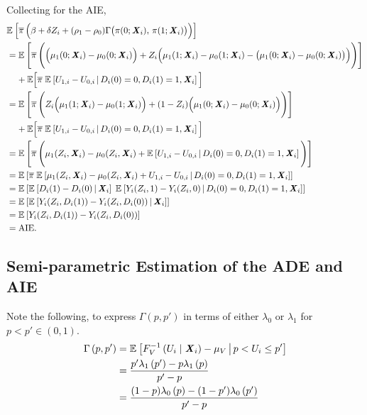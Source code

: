 Collecting for the AIE,
\begin{align*}
    &\mathbb{E}_{} \left[  \overline{\pi} \, \Big( \beta +  \delta Z_i +
        (\rho_1 - \rho_0) \Gamma \big(\pi(0; \boldsymbol{\mathit{X}}_i), \, \pi(1; \boldsymbol{\mathit{X}}_i) \big) \Big)  \right] \\
    &= \mathbb{E}_{} \left[  \overline{\pi} \, \Bigg( \Big( \mu_1(0; \boldsymbol{\mathit{X}}_i) - \mu_0(0; \boldsymbol{\mathit{X}}_i) \Big)
        +  Z_i \Big( \mu_1(1; \boldsymbol{\mathit{X}}_i) - \mu_0(1; \boldsymbol{\mathit{X}}_i)
            - \big(\mu_1(0; \boldsymbol{\mathit{X}}_i) - \mu_0(0; \boldsymbol{\mathit{X}}_i) \big) \Big) \Bigg)  \right] \\
    &\;\;\;\; + \mathbb E \Big[ \overline{\pi} \; \mathbb{E}_{} \left[  U_{1,i} - U_{0,i}  \, \middle\vert \, D_i(0) = 0, D_i(1) = 1, \boldsymbol{\mathit{X}}_i \right] \Big] \\
    &= \mathbb{E}_{} \left[  \overline{\pi} \, \Bigg(
        Z_i \Big( \mu_1(1; \boldsymbol{\mathit{X}}_i) - \mu_0(1; \boldsymbol{\mathit{X}}_i) \Big)
        + (1 - Z_i) \Big( \mu_1(0; \boldsymbol{\mathit{X}}_i) - \mu_0(0; \boldsymbol{\mathit{X}}_i) \Big) \Bigg)  \right] \\
    &\;\;\;\; + \mathbb E \Big[ \overline{\pi} \; \mathbb{E}_{} \left[  U_{1,i} - U_{0,i}  \, \middle\vert \, D_i(0) = 0, D_i(1) = 1, \boldsymbol{\mathit{X}}_i \right] \Big] \\
    &= \mathbb{E}_{} \left[  \overline{\pi} \, \Bigg(
        \mu_1(Z_i, \boldsymbol{\mathit{X}}_i) - \mu_0(Z_i, \boldsymbol{\mathit{X}}_i)
        + \mathbb{E}_{} \left[  U_{1,i} - U_{0,i}  \, \middle\vert \, D_i(0) = 0, D_i(1) = 1, \boldsymbol{\mathit{X}}_i \right] \Bigg)  \right] \\
    &= \mathbb{E}_{} \left[  \overline{\pi} \; \mathbb{E}_{} \left[ 
        \mu_1(Z_i, \boldsymbol{\mathit{X}}_i) - \mu_0(Z_i, \boldsymbol{\mathit{X}}_i) + U_{1,i} - U_{0,i}  \, \middle\vert \, 
            D_i(0) = 0, D_i(1) = 1, \boldsymbol{\mathit{X}}_i \right]  \right] \\
    &= \mathbb{E}_{} \left[  \mathbb{E}_{} \left[ D_i(1) - D_i(0) \, \middle\vert \, \boldsymbol{\mathit{X}}_i \right] \; \mathbb{E}_{} \left[ 
        Y_i(Z_i, 1) - Y_i(Z_i, 0)  \, \middle\vert \,  D_i(0) = 0, D_i(1) = 1, \boldsymbol{\mathit{X}}_i \right]  \right] \\
    &= \mathbb{E}_{} \left[  \mathbb{E}_{} \left[ Y_i(Z_i,D_i(1)) - Y_i(Z_i,D_i(0)) \, \middle\vert \, \boldsymbol{\mathit{X}}_i \right]  \right] \\
    &= \mathbb{E}_{} \left[  Y_i(Z_i,D_i(1)) - Y_i(Z_i,D_i(0))  \right] \\
    &= \text{AIE}.
\end{align*}

\subsection{Semi-parametric Estimation of the ADE and AIE}
\label{appendix:semi-parametric}
Note the following, to express $\Gamma(p,p')$ in terms of either $\lambda_0$ or $\lambda_1$
for $p < p' \in (0,1)$.
\begin{align*}
    \Gamma\left(p,p'\right) 
        &= \mathbb{E}_{} \left[  F_V^{-1}\left( U_i \mid \boldsymbol{\mathit{X}}_i \right) - \mu_V \, \middle\vert \, p < U_i \leq p' \right] \\
        &= \frac{p'\lambda_1\left(p'\right) - p\lambda_1\left(p\right)}{p' - p} \\
        &= \frac{(1-p)\lambda_0\left(p\right) - (1-p')\lambda_0\left(p'\right)}{p' - p} \\
\end{align*}

